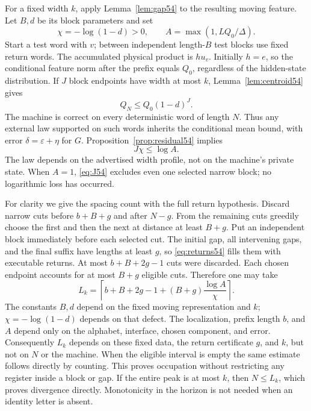 For a fixed width $k$, apply Lemma~\ref{lem:gap54} to the resulting moving feature. Let $B,d$ be its block parameters and set
\[
 \chi=-\log(1-d)>0,\qquad A=\max(1,LQ_0/\Delta).
\]
Start a test word with $v$; between independent length-$B$ test blocks use fixed return words. The accumulated physical product is $hu_v$. Initially $h=e$, so the conditional feature norm after the prefix equals $Q_0$, regardless of the hidden-state distribution. If $J$ block endpoints have width at most $k$, Lemma~\ref{lem:centroid54} gives
\[
 Q_N\le Q_0(1-d)^J.
\]
The machine is correct on every deterministic word of length $N$. Thus any external law supported on such words inherits the conditional mean bound, with error $\delta=\varepsilon+\eta$ for $G$. Proposition~\ref{prop:residual54} implies
\begin{equation}\label{eq:J54}
                         J\chi\le\log A.
\end{equation}
The law depends on the advertised width profile, not on the machine's private state. When $A=1$, \eqref{eq:J54} excludes even one selected narrow block; no logarithmic loss has occurred.

For clarity we give the spacing count with the full return hypothesis. Discard narrow cuts before $b+B+g$ and after $N-g$. From the remaining cuts greedily choose the first and then the next at distance at least $B+g$. Put an independent block immediately before each selected cut. The initial gap, all intervening gaps, and the final suffix have lengths at least $g$, so \eqref{eq:returns54} fills them with executable returns. At most $b+B+2g-1$ cuts were discarded. Each chosen endpoint accounts for at most $B+g$ eligible cuts. Therefore one may take
\begin{equation}\label{eq:Lk54}
 L_k=\left\lceil b+B+2g-1+(B+g)\frac{\log A}{\chi}\right\rceil.
\end{equation}
The constants $B,d$ depend on the fixed moving representation and $k$; $\chi=-\log(1-d)$ depends on that defect. The localization, prefix length $b$, and $A$ depend only on the alphabet, interface, chosen component, and error. Consequently $L_k$ depends on these fixed data, the return certificate $g$, and $k$, but not on $N$ or the machine. When the eligible interval is empty the same estimate follows directly by counting. This proves occupation without restricting any register inside a block or gap. If the entire peak is at most $k$, then $N\le L_k$, which proves divergence directly. Monotonicity in the horizon is not needed when an identity letter is absent.

